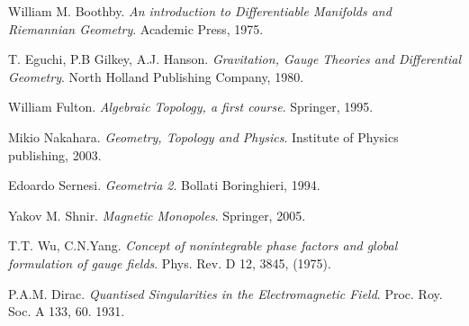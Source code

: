 \begin{thebibliography}{9}

William M. Boothby.
\textit{An introduction to Differentiable Manifolds and Riemannian Geometry}.
Academic Press, 1975.

T. Eguchi, P.B Gilkey, A.J. Hanson.
\textit{Gravitation, Gauge Theories and Differential Geometry}.
North Holland Publishing Company, 1980.

  William Fulton.
  \textit{Algebraic Topology, a first course}.
  Springer, 1995.

   Mikio Nakahara.
   \textit{Geometry, Topology and Physics}.
   Institute of Physics publishing, 2003.

   Edoardo Sernesi.
   \textit{Geometria 2}.
   Bollati Boringhieri, 1994.

  Yakov M. Shnir.
  \textit{Magnetic Monopoles}.
  Springer, 2005.

   T.T. Wu, C.N.Yang.
   \textit{Concept of nonintegrable phase factors and global formulation of gauge fields}.
   Phys. Rev. D 12, 3845, (1975).

  P.A.M. Dirac.
  \textit{Quantised Singularities in the Electromagnetic Field}.
  Proc. Roy. Soc. A 133, 60. 1931.


\end{thebibliography}
